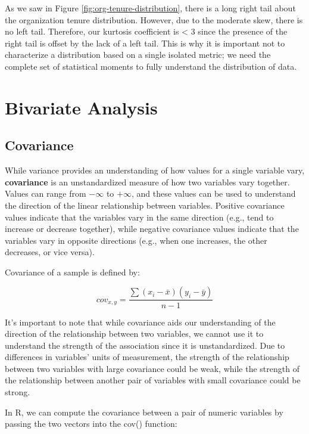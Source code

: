 \documentclass[]{book}
\begin{document}
As we saw in Figure \ref{fig:org-tenure-distribution}, there is a long right tail about the organization tenure distribution. However, due to the moderate skew, there is no left tail. Therefore, our kurtosis coefficient is \textless{} 3 since the presence of the right tail is offset by the lack of a left tail. This is why it is important not to characterize a distribution based on a single isolated metric; we need the complete set of statistical moments to fully understand the distribution of data.

\hypertarget{bivariate-analysis}{%
\section{Bivariate Analysis}\label{bivariate-analysis}}

\hypertarget{covariance}{%
\subsection{Covariance}\label{covariance}}

While variance provides an understanding of how values for a single variable vary, \textbf{covariance} is an unstandardized measure of how two variables vary together. Values can range from \(-\infty\) to \(+\infty\), and these values can be used to understand the direction of the linear relationship between variables. Positive covariance values indicate that the variables vary in the same direction (e.g., tend to increase or decrease together), while negative covariance values indicate that the variables vary in opposite directions (e.g., when one increases, the other decreases, or vice versa).

Covariance of a sample is defined by:

\[ cov_{x,y} = \frac{\sum(x_{i}-\bar{x})(y_{i}-\bar{y})}{n-1} \]

It's important to note that while covariance aids our understanding of the direction of the relationship between two variables, we cannot use it to understand the strength of the association since it is unstandardized. Due to differences in variables' units of measurement, the strength of the relationship between two variables with large covariance could be weak, while the strength of the relationship between another pair of variables with small covariance could be strong.

In R, we can compute the covariance between a pair of numeric variables by passing the two vectors into the cov() function:
\end{document}
